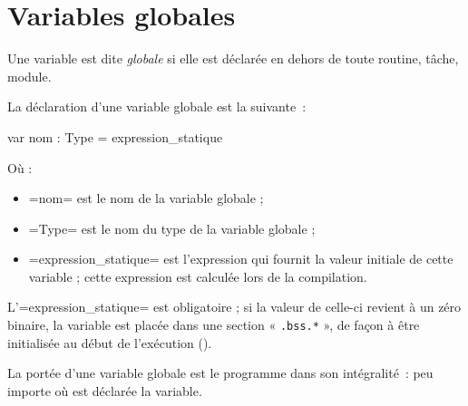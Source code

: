




\chapter{Variables globales}

Une variable est dite \emph{globale} si elle est déclarée en dehors de toute routine, tâche, module.


%





La déclaration d'une variable globale est la suivante~:

\begin{OMNIBUS}
var nom : Type = expression_statique
\end{OMNIBUS}

Où :
\begin{itemize}
  \item \omnibus=nom= est le nom de la variable globale ;
  \item \omnibus=Type= est le nom du type de la variable globale ;
  \item \omnibus=expression_statique= est l'expression qui fournit la valeur initiale de cette variable ; cette expression est calculée lors de la compilation.
\end{itemize}

L'\omnibus=expression_statique= est obligatoire ; si la valeur de celle-ci revient à un zéro binaire, la variable est placée dans une section « \texttt{.bss.*} », de façon à être initialisée au début de l'exécution ().

La portée d'une variable globale est le programme dans son intégralité~: peu importe où est déclarée la variable.

